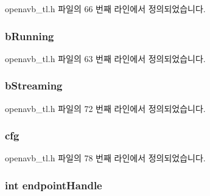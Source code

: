 openavb\+\_\+tl.\+h 파일의 66 번째 라인에서 정의되었습니다.

\subsubsection[{\texorpdfstring{b\+Running}{bRunning}}]{ b\+Running}\hypertarget{structtl__state__t_acf182b7b2127314d5d00c6df827734b5}{}\label{structtl__state__t_acf182b7b2127314d5d00c6df827734b5}


openavb\+\_\+tl.\+h 파일의 63 번째 라인에서 정의되었습니다.

\subsubsection[{\texorpdfstring{b\+Streaming}{bStreaming}}]{ b\+Streaming}\hypertarget{structtl__state__t_a3aa3817b2cc5c2c4382ceb050c83225d}{}\label{structtl__state__t_a3aa3817b2cc5c2c4382ceb050c83225d}


openavb\+\_\+tl.\+h 파일의 72 번째 라인에서 정의되었습니다.

\subsubsection[{\texorpdfstring{cfg}{cfg}}]{ cfg}\hypertarget{structtl__state__t_a7b8161c0e9a273c59fbc1dfda943953e}{}\label{structtl__state__t_a7b8161c0e9a273c59fbc1dfda943953e}


openavb\+\_\+tl.\+h 파일의 78 번째 라인에서 정의되었습니다.

\subsubsection[{\texorpdfstring{endpoint\+Handle}{endpointHandle}}]{\setlength{\rightskip}{0pt plus 5cm}int endpoint\+Handle}\hypertarget{structtl__state__t_ab3ab35067245073649b909ddc82c2807}{}\label{structtl__state__t_ab3ab35067245073649b909ddc82c2807}



